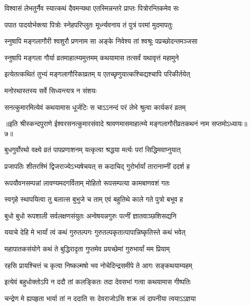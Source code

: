 \twolineshloka
{विश्वासं लेभतुर्नैव स्यात्कथं दैवमन्यथा}
{एतस्मिन्नन्तरे प्राप्तः पित्रोरन्तिकमेव सः} %

\twolineshloka
{पपात पादयोर्भक्त्या पित्रोः स्नेहपरिप्लुतः}
{मूर्ध्न्यवनाय तं पुत्रं परमां मुदमापतुः} %

\twolineshloka
{स्नुषापि मङ्गलागौरी श्वशुरौ प्रणनाम सा}
{अङ्के निवेश्य तां श्वश्रूः पप्रच्छोदन्तमञ्जसा} %

\twolineshloka
{स्नुषापि मङ्गला गौर्या व्रतमाहात्म्यमुत्तमम्}
{कथयामास तत्सर्वं यथावृत्तं महामुने} %

\twolineshloka
{इत्येतत्कथितं तुभ्यं मङ्गलागौरिकाव्रतम्}
{य एतच्छृणुयात्कश्चिद्यश्चापि परिकीर्तयेत्} %

\onelineshloka
{मनोरथास्तस्य सर्वे सिध्यन्त्यत्र न संशयः} %


\twolineshloka
{सनत्कुमारमित्येवं कथयामास धूर्जटिः}
{स चाऽऽनन्दं परं लेभे श्रुत्वा कार्यकरं व्रतम्} %


{॥इति श्रीस्कन्दपुराणे ईश्वरसनत्कुमारसंवादे श्रावणमासमाहात्म्ये मङ्गलागौरीव्रतकथनं नाम सप्तमोऽध्यायः॥७॥}




\twolineshloka
{बुधगुर्वोरथो वक्ष्ये व्रतं पापप्रणाशनम्}
{यत्कृत्वा श्रद्धया मर्त्यः परां सिद्धिमवाप्नुयात्} %

\twolineshloka
{प्रजापतिः शीतरश्मिं द्विजराज्येऽभ्यषेचयत्}
{स कदाचिद् गुरोर्भार्यां तारानाम्नीं ददर्श ह} %

\twolineshloka
{रूपयौवनसम्पन्नां लावण्यमदगर्विताम्}
{मोहितो रूपसम्पत्या कामबाणवशं गतः} %

\twolineshloka
{स्वगृहे स्थापयित्वा तु बलात्स बुभुजे च ताम्}
{एवं बहुतिथे काले गते पुत्रो बभूव ह} %

\twolineshloka
{बुधो बुधो रूपशाली सर्वलक्षणसंयुतः}
{अन्वेषयन्नगुरुः पत्नीं ज्ञातवाञ्छशिसद्यनि} %

\twolineshloka
{ययाचे देहि मे भार्यां त्वं कथं गुरुतल्पगः}
{गुरुतल्पकृतात्पापान्निष्कृतिस्ते कथं भवेत्} %

\twolineshloka
{महापातकसंयोगे कथं ते बुद्धिरादृता}
{गुप्तमेव प्रयच्छेमां गुरुभार्यां मम प्रियाम्} %

\twolineshloka
{रहसि प्रायश्चित्तं च कृत्वा निष्कल्मषो भव}
{नोचेदिन्द्रसमीपे ते आगः सङ्कथयाम्यहम्} %

\twolineshloka
{इत्येवं बहुधोक्तोऽपि न ददौ तां कलङ्कितः}
{तदा देवसभां गत्वा कथयामास गीष्पतिः} %

\twolineshloka
{चन्द्रेण मे ह्यपहृता भार्या तां न ददाति सः}
{देवराजोऽसि शक्र त्वं दापनीया त्वयाऽऽज्ञया} %

